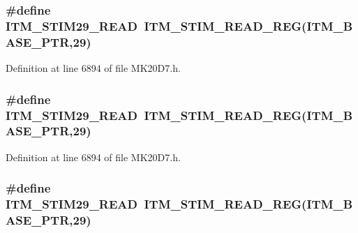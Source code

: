 \subsubsection[{\texorpdfstring{I\+T\+M\+\_\+\+S\+T\+I\+M29\+\_\+\+R\+E\+AD}{ITM_STIM29_READ}}]{\setlength{\rightskip}{0pt plus 5cm}\#define I\+T\+M\+\_\+\+S\+T\+I\+M29\+\_\+\+R\+E\+AD~{\bf I\+T\+M\+\_\+\+S\+T\+I\+M\+\_\+\+R\+E\+A\+D\+\_\+\+R\+EG}({\bf I\+T\+M\+\_\+\+B\+A\+S\+E\+\_\+\+P\+TR},29)}\hypertarget{group___i_t_m___register___accessor___macros_ga91514a35de0d63d08518557abf3a4092}{}\label{group___i_t_m___register___accessor___macros_ga91514a35de0d63d08518557abf3a4092}


Definition at line 6894 of file M\+K20\+D7.\+h.

\subsubsection[{\texorpdfstring{I\+T\+M\+\_\+\+S\+T\+I\+M29\+\_\+\+R\+E\+AD}{ITM_STIM29_READ}}]{\setlength{\rightskip}{0pt plus 5cm}\#define I\+T\+M\+\_\+\+S\+T\+I\+M29\+\_\+\+R\+E\+AD~{\bf I\+T\+M\+\_\+\+S\+T\+I\+M\+\_\+\+R\+E\+A\+D\+\_\+\+R\+EG}({\bf I\+T\+M\+\_\+\+B\+A\+S\+E\+\_\+\+P\+TR},29)}\hypertarget{group___i_t_m___register___accessor___macros_ga91514a35de0d63d08518557abf3a4092}{}\label{group___i_t_m___register___accessor___macros_ga91514a35de0d63d08518557abf3a4092}


Definition at line 6894 of file M\+K20\+D7.\+h.

\subsubsection[{\texorpdfstring{I\+T\+M\+\_\+\+S\+T\+I\+M29\+\_\+\+R\+E\+AD}{ITM_STIM29_READ}}]{\setlength{\rightskip}{0pt plus 5cm}\#define I\+T\+M\+\_\+\+S\+T\+I\+M29\+\_\+\+R\+E\+AD~{\bf I\+T\+M\+\_\+\+S\+T\+I\+M\+\_\+\+R\+E\+A\+D\+\_\+\+R\+EG}({\bf I\+T\+M\+\_\+\+B\+A\+S\+E\+\_\+\+P\+TR},29)}\hypertarget{group___i_t_m___register___accessor___macros_ga91514a35de0d63d08518557abf3a4092}{}\label{group___i_t_m___register___accessor___macros_ga91514a35de0d63d08518557abf3a4092}


